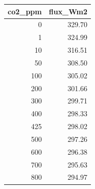 \begin{tabular}{rr}
\toprule
co2_ppm & flux_Wm2 \\
\midrule
0 & 329.70 \\
1 & 324.99 \\
10 & 316.51 \\
50 & 308.50 \\
100 & 305.02 \\
200 & 301.66 \\
300 & 299.71 \\
400 & 298.33 \\
425 & 298.02 \\
500 & 297.26 \\
600 & 296.38 \\
700 & 295.63 \\
800 & 294.97 \\
\bottomrule
\end{tabular}
